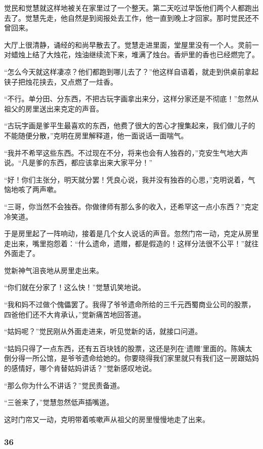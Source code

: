 \par 觉民和觉慧就这样地被关在家里过了一个整天。第二天吃过早饭他们两个人都跑出去了。觉慧先走，他自然是到阅报处去工作，他一直到晚上才回家。那时觉民还不曾回来。
\par 大厅上很清静，诵经的和尚早散去了。觉慧走进里面，堂屋里没有一个人。灵前一对蜡烛上结了大烛花，烛油继续流下来，堆满了烛台。香炉里的香也已经燃完了。
\par “怎么今天就这样凄凉？他们都跑到哪儿去了？”他这样自语着，就走到供桌前拿起铗子把烛花挟去，又点燃了一炷香。
\par “不行。单分田、分东西，不把古玩字画拿出来分，这样分家还是不彻底！”忽然从祖父的房里送出来克定的声音。
\par “古玩字画是爹平生最喜欢的东西，他费了很大的苦心才搜集起来，我们做儿子的不能随便分散，”克明在房里解释道，他一面说话一面喘气。
\par “我并不希罕这些东西。不过现在不分，将来也会有人独吞的，”克安生气地大声说。“凡是爹的东西，都应该拿出来大家平分！”
\par “好！你们主张分，明天就分罢！凭良心说，我并没有独吞的心思，”克明说着，气恼地咳了两声嗽。
\par “三哥，你当然不会独吞。你做律师有那么多的收入，还希罕这一点小东西？”克定冷笑道。
\par 于是房里起了一阵响动，接着是几个女人说话的声音。忽然门帘一动，克定从房里走出来，嘴里抱怨着：“什么遗命，遗赠，都是假造的！这样分法很不公平！”就往外面走了。
\par 觉新神气沮丧地从房里走出来。
\par “你们就在分家了！这么快！”觉慧讥笑地说。
\par “我和妈不过做个傀儡罢了。我得了爷爷遗命所给的三千元西蜀商业公司的股票，四爸他们还不大肯承认，”觉新痛苦地回答道。
\par “姑妈呢？”觉民刚从外面走进来，听见觉新的话，就接口问道。
\par “姑妈只得了一点东西，还有五百块钱的股票，这还是列在‘遗赠’里面的。陈姨太倒分得一所公馆，是爷爷遗命给她的。你要晓得我们家里就只有我们这一房跟姑妈的感情好，哪个肯替姑妈讲话？”觉新感叹地说。
\par “那么你为什么不讲话？”觉民责备道。
\par “三爸来了，”觉慧忽然低声插嘴道。
\par 这时门帘又一动，克明带着咳嗽声从祖父的房里慢慢地走了出来。

\subsubsection*{36}

